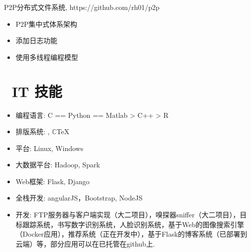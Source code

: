 \documentclass{resume}
\begin{document}
\begin{onehalfspacing}
P2P分布式文件系统, https://github.com/rh01/p2p
\begin{itemize}
  \item P2P集中式体系架构
  \item 添加日志功能
  \item 使用多线程编程模型
\end{itemize}
\end{onehalfspacing}


\section{\faCogs\ IT 技能}
\begin{itemize}[parsep=0.5ex]
  \item 编程语言: C == Python == Matlab > C++ > R 
  \item 排版系统: \LaTeXe, $\mathbb{C}$\TeX
  \item 平台: Linux, Windows
  \item 大数据平台: Hadoop, Spark
  \item Web框架: Flask, Django
  \item 全栈开发: angularJS，Bootstrap, NodeJS
  \item 开发: FTP服务器与客户端实现（大二项目），嗅探器sniffer（大二项目），目标跟踪系统，书写数字识别系统，人脸识别系统，基于Web的图像搜索引擎（Docker应用），推荐系统（正在开发中），基于Flask的博客系统（已部署到云端）等，部分应用可以在已托管在github上.

\end{itemize}
\end{document}
